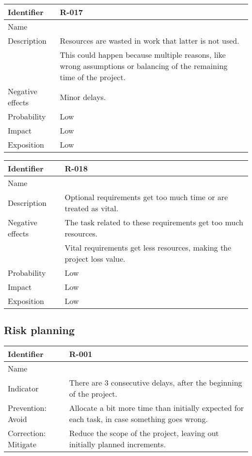 \begin{table}[H]
	\begin{tabularx}{\textwidth}{|l|X|}
		\hline
		\rowcolor{gray!30}
		Identifier & \textbf{R-017} \\ \hline
		Name & \Rdiecisiete \\ \hline
		Description
			& Resources are wasted in work that latter is not used. \\
			& This could happen because multiple reasons, like wrong assumptions or balancing of the remaining time of the project.\\ \hline
		Negative effects
			& Minor delays. \\ \hline
		Probability & Low\\ \hline
		Impact &  Low\\ \hline
		Exposition &  Low\\ \hline
	\end{tabularx}
\end{table}

\begin{table}[H]
	\begin{tabularx}{\textwidth}{|l|X|}
		\hline
		\rowcolor{gray!30}
		Identifier & \textbf{R-018} \\ \hline
		Name & \Rdieciocho \\ \hline
		Description
			& Optional requirements get too much time or are treated as vital. \\ \hline
		Negative effects
			& The task related to these requirements get too much resources.\\
			& Vital requirements get less resources, making the project loss value.  \\ \hline
		Probability & Low\\ \hline
		Impact &  Low\\ \hline
		Exposition &  Low\\ \hline
	\end{tabularx}
\end{table}

\subsection{Risk planning}

\begin{table}[H]
	\begin{tabularx}{\textwidth}{|y|z|}
		\hline
		Identifier & \textbf{R-001} \\ \hline
		Name & \Runo \\ \hline
		Indicator & There are 3 consecutive delays, after the beginning of the project.\\ \hline
		Prevention: Avoid
			& Allocate a bit more time than initially expected for each task, in case something goes wrong.\\ \hline
		Correction: Mitigate
			& Reduce the scope of the project, leaving out initially planned increments. \\ \hline
	\end{tabularx}
\end{table}

